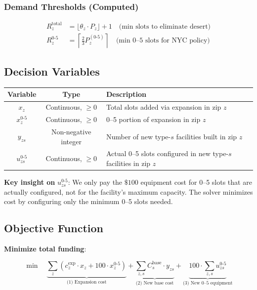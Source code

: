 \documentclass[12pt]{article}
\begin{document}
\subsubsection{Demand Thresholds (Computed)}

\begin{align}
R_z^{\text{total}} &= \lfloor \theta_z \cdot P_z \rfloor + 1 \quad \text{(min slots to eliminate desert)} \\
R_z^{0\text{-}5} &= \left\lceil \frac{2}{3} P_z^{(0\text{-}5)} \right\rceil \quad \text{(min 0--5 slots for NYC policy)}
\end{align}

\subsection{Decision Variables}

\begin{table}[h]
\centering
\begin{tabular}{|c|c|p{8cm}|}
\hline
\textbf{Variable} & \textbf{Type} & \textbf{Description} \\
\hline
$x_z$ & Continuous, $\geq 0$ & Total slots added via expansion in zip $z$ \\
\hline
$x_z^{0\text{-}5}$ & Continuous, $\geq 0$ & 0--5 portion of expansion in zip $z$ \\
\hline
$y_{zs}$ & Non-negative integer & Number of new type-$s$ facilities built in zip $z$ \\
\hline
$u_{zs}^{0\text{-}5}$ & Continuous, $\geq 0$ & Actual 0--5 slots configured in new type-$s$ facilities in zip $z$ \\
\hline
\end{tabular}
\end{table}

\noindent
\textbf{Key insight on} $u_{zs}^{0\text{-}5}$: We only pay the $\$100$ equipment cost for 0--5 slots that are actually configured, 
not for the facility's maximum capacity. The solver minimizes cost by configuring only the minimum 0--5 slots needed.

\subsection{Objective Function}

\textbf{Minimize total funding}:

\begin{equation}
\min \quad \underbrace{\sum_{z} \left( c_z^{\text{exp}} \cdot x_z + 100 \cdot x_z^{0\text{-}5} \right)}_{\text{(1) Expansion cost}} 
+ \underbrace{\sum_{z,s} C_s^{\text{base}} \cdot y_{zs}}_{\text{(2) New base cost}} 
+ \underbrace{100 \cdot \sum_{z,s} u_{zs}^{0\text{-}5}}_{\text{(3) New 0--5 equipment}}
\label{eq:objective}
\end{equation}
\end{document}
